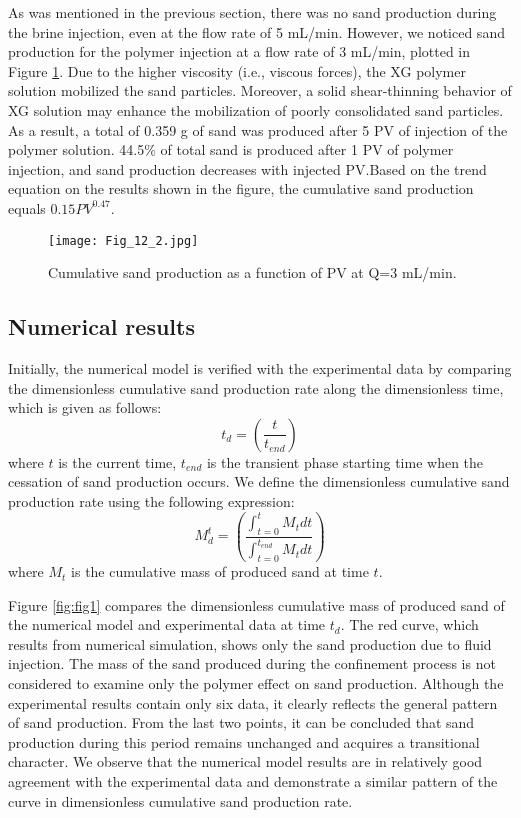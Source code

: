 \documentclass{article}
\begin{document}
As was mentioned in the previous section, there was no sand production during the brine injection, even at the flow rate of 5 mL/min.  However, we noticed sand production for the polymer injection at a flow rate of 3 mL/min, plotted in Figure \ref{fig:sand_prod_exp}. Due to the higher viscosity (i.e., viscous forces), the XG polymer solution mobilized the sand particles. Moreover, a solid shear-thinning behavior of XG solution may enhance the mobilization of poorly consolidated sand particles. 
As a result,  a total of 0.359 g of sand was produced after 5 PV of injection of the polymer solution. 44.5\% of total sand is produced after 1 PV of polymer injection, and sand production decreases with injected PV.Based on the trend equation on the results shown in the figure, the cumulative sand production equals $0.15PV^{0.47}$.
\begin{figure}[H]
\begin{centering}
\texttt{[image: Fig\_12\_2.jpg]}
\par\end{centering}
\caption{Cumulative sand production as a function of PV at Q=3 mL/min.\label{fig:sand_prod_exp}}
\end{figure}


\subsection{Numerical results}


Initially, the numerical model is verified with the experimental data by comparing the dimensionless cumulative sand production rate along the dimensionless time, which is given as follows:
\begin{equation}
t_{d} = \left(\displaystyle \frac{t}{t_{end}}\right)\label{eq:39}
\end{equation}
where $t$ is the current time, $t_{end}$ is the transient phase starting time when the cessation of sand production occurs. We define the dimensionless cumulative sand production rate using the following expression:
\begin{equation}
M^{t}_{d} = \left(\displaystyle \frac{ \int_{t=0}^{t}M_{t}dt}{\int_{t=0}^{t_{end}}M_{t}dt}\right)\label{eq:40}
\end{equation}
where $M_{t}$ is the cumulative mass of produced sand at time $t$. 

Figure \ref{fig:fig1} compares the dimensionless cumulative mass of produced sand of the numerical model and experimental data at time $t_{d}$. The red curve, which results from numerical simulation, shows only the sand production due to fluid injection. The mass of the sand produced during the confinement process is not considered to examine only the polymer effect on sand production. Although the experimental results contain only six data, it clearly reflects the general pattern of sand production. From the last two points, it can be concluded that sand production during this period remains unchanged and acquires a transitional character. We observe that the numerical model results are in relatively good agreement with the experimental data and demonstrate a similar pattern of the curve in dimensionless cumulative sand production rate.
\end{document}
